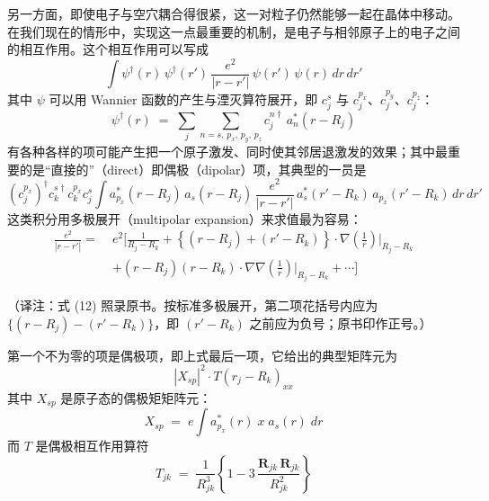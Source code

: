 另一方面，即使电子与空穴耦合得很紧，这一对粒子仍然能够一起在晶体中移动。在我们现在的情形中，实现这一点最重要的机制，是电子与相邻原子上的电子之间的相互作用。这个相互作用可以写成
\begin{equation*}
\int \psi^{\dagger}(r)\,\psi^{\dagger}(r')\,\frac{e^2}{|r-r'|}\,\psi(r')\,\psi(r)\,dr\,dr' \tag{11}
\end{equation*}
其中 $\psi$ 可以用 Wannier 函数的产生与湮灭算符展开，即 $c_j^s$ 与 $c_j^{p_x}$、$c_j^{p_y}$、$c_j^{p_z}$：
\begin{equation*}
\psi^{\dagger}(r) \;=\; \sum_j \sum_{n=s,\,p_x,\,p_y,\,p_z} c_j^{n\dagger}\, a_n^{*}(r-R_j)
\end{equation*}
有各种各样的项可能产生把一个原子激发、同时使其邻居退激发的效果；其中最重要的是“直接的”（direct）即偶极（dipolar）项，其典型的一员是
\begin{equation*}
\left(c_j^{p_x}\right)^{\dagger} c_k^{s\dagger} c_k^{p_x} c_j^{s} \int a_{p_x}^{*}(r-R_j)\, a_s(r-R_j)\, \frac{e^2}{|r-r'|}\, a_s^{*}(r'-R_k)\, a_{p_x}(r'-R_k)\, dr\, dr'
\end{equation*}
这类积分用多极展开（multipolar expansion）来求值最为容易：
\begin{align*}
\frac{e^2}{|r-r'|} = \; & e^2 \Bigg[ \frac{1}{R_j - R_k} + \left\{ (r-R_j) + (r'-R_k) \right\} \cdot \nabla\!\left(\frac{1}{r}\right)\Big|_{R_j-R_k} \\
& + (r-R_j)(r-R_k) \cdot \nabla\nabla\!\left(\frac{1}{r}\right)\Big|_{R_j-R_k} + \cdots \Bigg] \tag{12}
\end{align*}

（译注：式 (12) 照录原书。按标准多极展开，第二项花括号内应为 $\{(r-R_j)-(r'-R_k)\}$，即 $(r'-R_k)$ 之前应为负号；原书印作正号。）

第一个不为零的项是偶极项，即上式最后一项，它给出的典型矩阵元为
\begin{equation*}
|X_{sp}|^2 \cdot T(r_j - R_k)_{xx}
\end{equation*}
其中 $X_{sp}$ 是原子态的偶极矩矩阵元：
\begin{equation*}
X_{sp} \;=\; e \int a_{p_x}^{*}(r)\; x\; a_s(r)\; dr
\end{equation*}
而 $T$ 是偶极相互作用算符
\begin{equation*}
T_{jk} \;=\; \frac{1}{R_{jk}^{3}} \left\{ 1 - 3\,\frac{\mathbf{R}_{jk}\,\mathbf{R}_{jk}}{R_{jk}^{2}} \right\}
\end{equation*}

